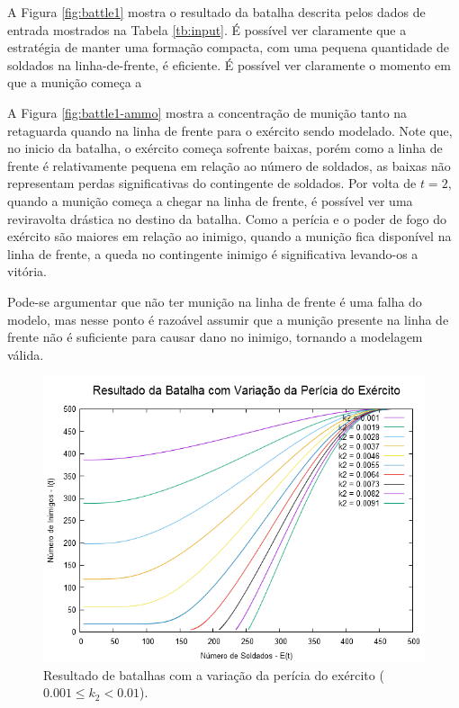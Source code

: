 \documentclass{article}
\begin{document}
A Figura \ref{fig:battle1} mostra o resultado da batalha descrita pelos dados de entrada mostrados na Tabela \ref{tb:input}. É possível ver claramente que a estratégia de manter uma formação compacta, com uma pequena quantidade de soldados na linha-de-frente, é eficiente. É possível ver claramente o momento em que a munição começa a 

A Figura \ref{fig:battle1-ammo} mostra a concentração de munição tanto na retaguarda quando na linha de frente para o exército sendo modelado. Note que, no inicio da batalha, o exército começa sofrente baixas, porém como a linha de frente é relativamente pequena em relação ao número de soldados, as baixas não representam perdas significativas do contingente de soldados. Por volta de $t = 2$, quando a munição começa a chegar na linha de frente, é possível ver uma reviravolta drástica no destino da batalha. Como a perícia e o poder de fogo do exército são maiores em relação ao inimigo, quando a munição fica disponível na linha de frente, a queda no contingente inimigo é significativa levando-os a vitória.

Pode-se argumentar que não ter munição na linha de frente é uma falha do modelo, mas nesse ponto é razoável assumir que a munição presente na linha de frente não é suficiente para causar dano no inimigo, tornando a modelagem válida.

\begin{figure}[ht]
	\centering
	\includegraphics[scale=0.3]{figs/battle_army_skill_variation.png}
	\caption{Resultado de batalhas com a variação da perícia do exército ($0.001 \leq k_2 < 0.01$).}
	\label{fig:army-skill-variation}
\end{figure}
\end{document}
